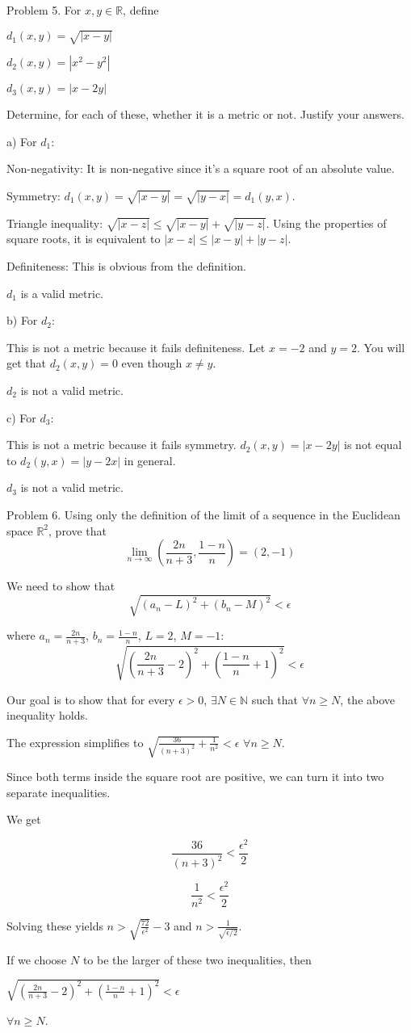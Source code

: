 \documentclass{article}
\newcommand{\NN}{\mathbb{N}}
\newcommand{\RR}{\mathbb{R}}
\begin{document}
Problem 5. For $x, y \in \RR$, define

$d_1(x, y) = \sqrt{|x - y|}$

$d_2(x, y) = |x^2 - y^2|$

$d_3(x, y) = |x - 2y|$

Determine, for each of these, whether it is a metric or not. Justify your answers.

a) For $d_1$:

Non-negativity: It is non-negative since it's a square root of an absolute value.

Symmetry: $d_1(x, y) = \sqrt{|x-y|} = \sqrt{|y-x|} = d_1(y, x)$.

Triangle inequality: $\sqrt{|x-z|} \leq \sqrt{|x-y|} + \sqrt{|y-z|}$.
Using the properties of square roots, it is equivalent to $|x-z| \leq |x-y| + |y-z|$.

Definiteness: This is obvious from the definition.

$d_1$ is a valid metric.

b) For $d_2$:

This is not a metric because it fails definiteness.
Let $x = -2$ and $y = 2$.
You will get that $d_2(x, y) = 0$ even though $x \neq y$.

$d_2$ is not a valid metric.

c) For $d_3$:

This is not a metric because it fails symmetry.
$d_2(x, y) = |x - 2y|$ is not equal to $d_2(y, x) = |y - 2x|$ in general.

$d_3$ is not a valid metric.


Problem 6. Using only the definition of the limit of a sequence in the Euclidean space $\RR^2$,
prove that
\[\lim_{n \to \infty} \left(\frac{2n}{n+3}, \frac{1-n}{n}\right) = (2, -1)\]

We need to show that
\[\sqrt{(a_n - L)^2 + (b_n - M)^2} < \epsilon\]

where $a_n = \frac{2n}{n+3}$, $b_n = \frac{1-n}{n}$, $L = 2$, $M = -1$:
\[\sqrt{\left(\frac{2n}{n+3} - 2\right)^2 + \left(\frac{1-n}{n} + 1\right)^2} < \epsilon\]

Our goal is to show that for every $\epsilon > 0$, $\exists N \in \NN$ such that
$\forall n \geq N$, the above inequality holds.

The expression simplifies to $\sqrt{\frac{36}{(n+3)^2} + \frac{1}{n^2}} < \epsilon$
$\forall n \geq N$.

Since both terms inside the square root are positive, we can turn it into two separate
inequalities.

We get

\[\frac{36}{(n+3)^2} < \frac{\epsilon^2}{2}\]

\[\frac{1}{n^2} < \frac{\epsilon^2}{2}\]

Solving these yields $n > \sqrt{\frac{72}{\epsilon^2}} - 3$ and $n > \frac{1}{\sqrt{\epsilon/2}}$.

If we choose $N$ to be the larger of these two inequalities, then

$\sqrt{\left(\frac{2n}{n+3} - 2\right)^2 + \left(\frac{1-n}{n} + 1\right)^2} < \epsilon$

$\forall n \geq N$.
\end{document}
